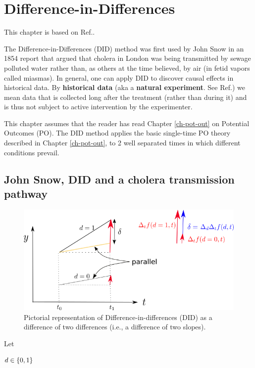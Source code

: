 \chapter{Difference-in-Differences}
\label{ch-did}

This chapter is based on
Ref.\cite{book-mixtape}.


The Difference-in-Differences (DID)
method was first used by John Snow
in an 1854 report that
argued that 
cholera in London
was being transmitted 
by sewage polluted water
rather than, as others
at the time believed, by air (in fetid vapors
called miasmas).
In general, one can
apply DID to discover 
causal effects in historical data.
By {\bf historical data} (aka a {\bf natural
experiment}. See Ref.\cite{wiki-nat-exp})
we mean data that is collected long
after the treatment (rather than during it)
 and is thus
not  subject to 
active intervention
by the experimenter. 

This chapter assumes that the
reader has read Chapter \ref{ch-pot-out}
on Potential Outcomes (PO).
The DID method
applies the basic single-time
PO theory described in Chapter \ref{ch-pot-out},
to 2
well separated times
in which
different conditions prevail.



\section{John Snow, DID  
and a cholera
transmission pathway}


\begin{figure}[h!]
\centering
\includegraphics[width=5in]
{did/dif-dif.png}
\caption{Pictorial representation of
 Difference-in-differences (DID) as a difference
of two differences (i.e., 
a difference of two slopes).} 
\label{fig-dif-dif}
\end{figure}

Let

$d\in \{0,1\}$

